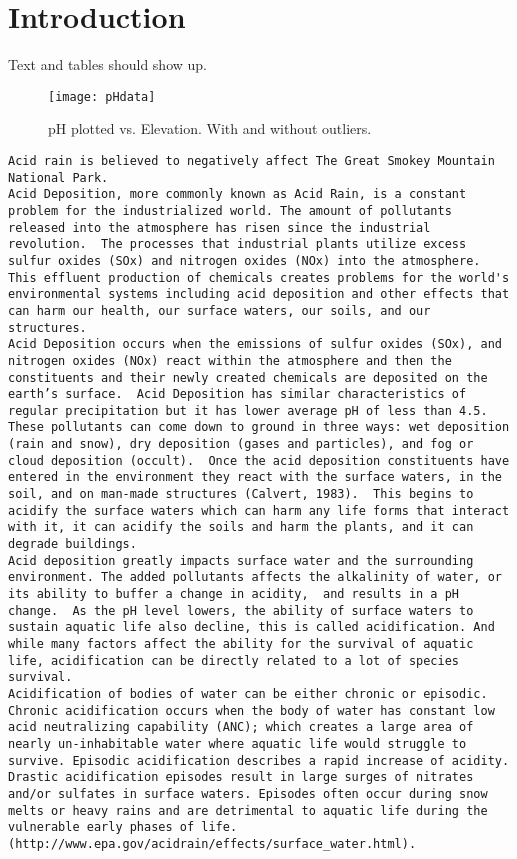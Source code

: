 \chapter{Introduction} \label{ch:introduction}
Text and tables should show up.

\begin{figure}[h!]
\centering
  \texttt{[image: pHdata]}\\
  \caption{pH plotted vs. Elevation.  With and without outliers.}\label{fig:pHdata}
\end{figure}
\begin{verbatim}
Acid rain is believed to negatively affect The Great Smokey Mountain National Park.
Acid Deposition, more commonly known as Acid Rain, is a constant problem for the industrialized world. The amount of pollutants released into the atmosphere has risen since the industrial revolution.  The processes that industrial plants utilize excess sulfur oxides (SOx) and nitrogen oxides (NOx) into the atmosphere. This effluent production of chemicals creates problems for the world's environmental systems including acid deposition and other effects that can harm our health, our surface waters, our soils, and our structures.
Acid Deposition occurs when the emissions of sulfur oxides (SOx), and nitrogen oxides (NOx) react within the atmosphere and then the constituents and their newly created chemicals are deposited on the earth’s surface.  Acid Deposition has similar characteristics of regular precipitation but it has lower average pH of less than 4.5.  These pollutants can come down to ground in three ways: wet deposition (rain and snow), dry deposition (gases and particles), and fog or cloud deposition (occult).  Once the acid deposition constituents have entered in the environment they react with the surface waters, in the soil, and on man-made structures (Calvert, 1983).  This begins to acidify the surface waters which can harm any life forms that interact with it, it can acidify the soils and harm the plants, and it can degrade buildings.
Acid deposition greatly impacts surface water and the surrounding environment. The added pollutants affects the alkalinity of water, or its ability to buffer a change in acidity,  and results in a pH change.  As the pH level lowers, the ability of surface waters to sustain aquatic life also decline, this is called acidification. And while many factors affect the ability for the survival of aquatic life, acidification can be directly related to a lot of species survival.  
Acidification of bodies of water can be either chronic or episodic. Chronic acidification occurs when the body of water has constant low acid neutralizing capability (ANC); which creates a large area of  nearly un-inhabitable water where aquatic life would struggle to survive. Episodic acidification describes a rapid increase of acidity. Drastic acidification episodes result in large surges of nitrates and/or sulfates in surface waters. Episodes often occur during snow melts or heavy rains and are detrimental to aquatic life during the vulnerable early phases of life. (http://www.epa.gov/acidrain/effects/surface_water.html).

\end{verbatim}
